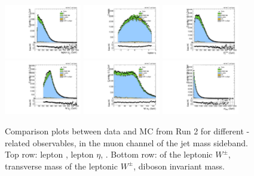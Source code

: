 \begin{figure}[htbp]
  \centering
  \includegraphics[width=0.3\textwidth]{fig/controlPlots/SB_b1_mu_allP_allC_allD_Run2_lnujj_l1_l_pt.pdf}
  \includegraphics[width=0.3\textwidth]{fig/controlPlots/SB_b1_mu_allP_allC_allD_Run2_lnujj_l1_l_eta.pdf}
  \includegraphics[width=0.3\textwidth]{fig/controlPlots/SB_b1_mu_allP_allC_allD_Run2_met_pt.pdf}\\
  \includegraphics[width=0.3\textwidth]{fig/controlPlots/SB_b1_mu_allP_allC_allD_Run2_lnujj_l1_pt.pdf}
  \includegraphics[width=0.3\textwidth]{fig/controlPlots/SB_b1_mu_allP_allC_allD_Run2_lnujj_l1_mt.pdf}
  \includegraphics[width=0.3\textwidth]{fig/controlPlots/SB_b1_mu_allP_allC_allD_Run2_mWV.pdf}
  \caption{
    Comparison plots between data and MC from Run 2 for different \Wlep-related observables, in the muon channel of the jet mass sideband.
    Top row: lepton \pt, lepton $\eta$, \ptmiss.
    Bottom row: \pt of the leptonic $W^\pm$, transverse mass of the leptonic $W^\pm$, diboson invariant mass.
  }
  \label{fig:SB_controlPlotsRun2_1}
\end{figure}

